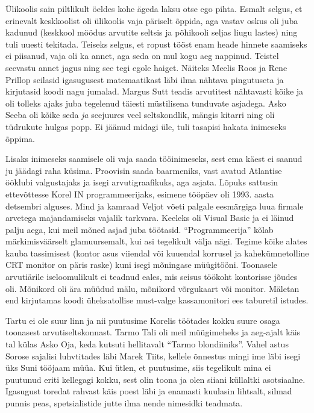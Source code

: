 Ülikoolis sain piltlikult öeldes kohe ägeda laksu otse ego pihta. Esmalt 
selgus, et erinevalt keskkoolist oli ülikoolis vaja päriselt õppida, aga vastav oskus 
oli juba kadunud (keskkool möödus arvutite seltsis ja põhikooli seljas 
liugu lastes) ning tuli uuesti tekitada. Teiseks selgus, et 
ropust tööst enam heade hinnete saamiseks ei piisanud, vaja oli ka annet, aga 
seda on mul kogu aeg nappinud. Teistel seevastu annet jagus 
ning see tegi egole haiget. Näiteks Meelis Roos 
ja Rene Prillop seilasid igasugusest matemaatikast läbi 
ilma nähtava pingutuseta ja kirjutasid koodi nagu jumalad. Margus 
Sutt teadis arvutitest nähtavasti kõike ja oli tolleks 
ajaks juba tegelenud täiesti müstilisena tunduvate asjadega. Asko 
Seeba oli kõike seda \emph{ja} seejuures veel 
seltskondlik, mängis kitarri ning oli tüdrukute hulgas popp. Ei jäänud 
midagi üle, tuli tasapisi hakata inimeseks õppima. 

Lisaks inimeseks saamisele oli vaja saada tööinimeseks, sest ema käest ei 
saanud ju jäädagi raha küsima. Proovisin saada baarmeniks, vast avatud Atlantise ööklubi valgustajaks ja isegi 
arvutigraafikuks, aga asjata. Lõpuks sattusin ettevõttesse Korel 
IN programmeerijaks, esimene tööpäev oli 1993. aasta detsembri alguses. Mind ja kamraad Veljot võeti palgale 
eesmärgiga luua firmale arvetega majandamiseks vajalik tarkvara. Keeleks oli 
Visual Basic ja ei läinud palju aega, kui meil mõned asjad 
juba töötasid. \enquote{Programmeerija} kõlab märkimisväärselt glamuursemalt, 
kui asi tegelikult välja nägi. Tegime kõike alates kauba tassimisest (kontor 
asus viiendal või kuuendal korrusel ja kahekümnetolline CRT monitor on päris 
raske) kuni isegi mõningase müügitööni. Toonasele arvutiärile iseloomulikult 
ei teadnud eales, mis seisus töökoht kontorisse jõudes oli. Mõnikord oli ära 
müüdud mälu, mõnikord võrgukaart või monitor. Mäletan end kirjutamas koodi 
üheksatollise must-valge kassamonitori ees taburetil istudes\label{sisu:jupimyyk}. 

Tartu ei ole suur linn ja nii puutusime Korelis töötades kokku suure osaga 
toonasest arvutiseltskonnast. Tarmo Tali oli meil 
müügimeheks ja aeg-ajalt käis tal külas Asko Oja, keda kutsuti
hellitavalt \enquote{Tarmo blondiiniks}. Vahel astus Sorose sajalisi 
luhvtitades läbi Marek Tiits, kellele õnnestus mingi ime läbi 
isegi üks Suni tööjaam müüa. Kui ütlen, et puutusime, siis tegelikult 
mina ei puutunud eriti kellegagi kokku, sest olin toona ja olen siiani küllaltki 
asotsiaalne. Igasugust toredat rahvast käis poest läbi ja enamasti kuulasin lihtsalt, 
silmad punnis peas, spetsialistide jutte ilma nende nimesidki teadmata. 

